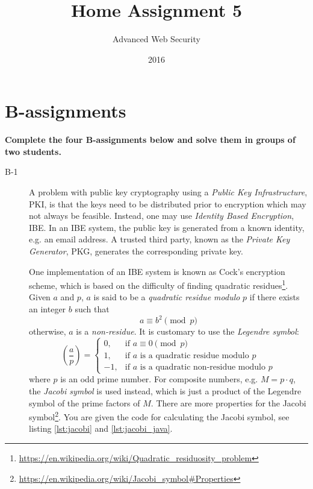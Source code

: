 \documentclass{article}
\begin{document}
\title{Home Assignment 5}
\author{Advanced Web Security}
\date{2016}

\maketitle

\section*{B-assignments}
\textbf{Complete the four B-assignments below and solve them in groups of two students.}

\begin{description}

	\item[B-1]{A problem with public key cryptography using a \emph{Public Key Infrastructure}, PKI, is that
    the keys need to be distributed prior to encryption which may not always be feasible.
    Instead, one may use \emph{Identity Based Encryption}, IBE. In an IBE system, the public key is generated
    from a known identity, e.g. an email address. A trusted third party, known as the \emph{Private Key Generator}, PKG,
    generates the corresponding private key.
    
    One implementation of an IBE system is known as Cock's encryption scheme,
    which is based on the difficulty of finding quadratic 
    residues\footnote{\url{https://en.wikipedia.org/wiki/Quadratic_residuosity_problem}}.
    Given $a$ and $p$, $a$ is said to be a \emph{quadratic residue modulo} $p$ if there exists an integer $b$
    such that
    \[
    a \equiv b^2 \pmod p
    \]
    otherwise, $a$ is a \emph{non-residue}.
    It is customary to use the \emph{Legendre symbol}:
    \[
    \left(\frac{a}{p}\right) = 
    \begin{cases}
    0, & \text{if $a \equiv 0 \pmod p$}\\
    1, & \text{if $a$ is a quadratic residue modulo $p$}\\
    -1, & \text{if $a$ is a quadratic non-residue modulo $p$}
    \end{cases}
    \]
    where $p$ is an odd prime number. For composite numbers, e.g. $M = p \cdot q$, the \emph{Jacobi symbol} is used
    instead, which is just a product of the Legendre symbol of the prime factors of $M$.
    There are more properties for the Jacobi symbol\footnote{\url{https://en.wikipedia.org/wiki/Jacobi_symbol#Properties}}. You are given the code
    for calculating the Jacobi symbol, see listing \ref{lst:jacobi} and \ref{lst:jacobi_java}. 
    
}
\end{description}
\end{document}
